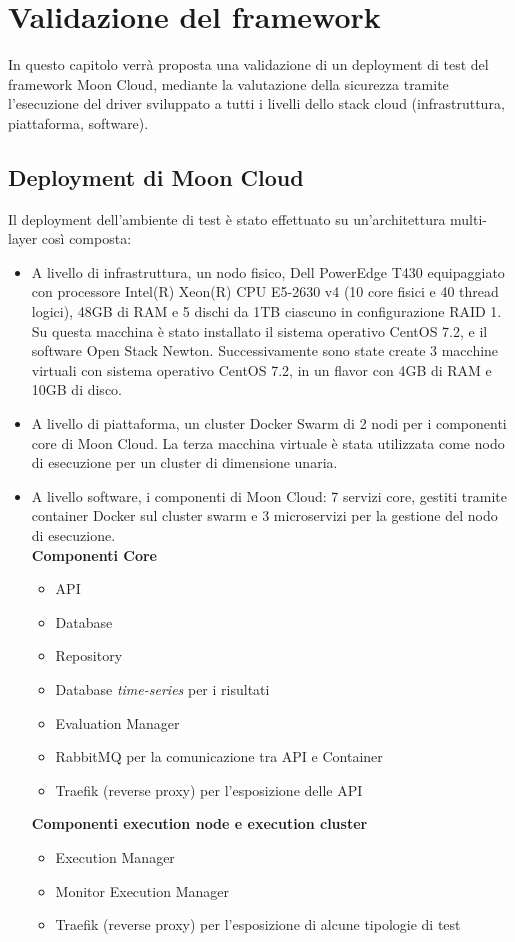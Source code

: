 \documentclass[../main.tex]{subfiles}
\begin{document}
\chapter{Validazione del framework}
In questo capitolo verrà proposta una validazione di un deployment di test del framework Moon Cloud, mediante la valutazione della sicurezza tramite l'esecuzione del driver sviluppato a tutti i livelli dello stack cloud (infrastruttura, piattaforma, software). 

\section{Deployment di Moon Cloud}

Il deployment dell'ambiente di test è stato effettuato su un'architettura multi-layer così composta:
\begin{itemize}
    \item A livello di infrastruttura, un nodo fisico, Dell PowerEdge T430 equipaggiato con processore Intel(R) Xeon(R) CPU E5-2630 v4 (10 core fisici e 40 thread logici), 48GB di RAM e 5 dischi da 1TB ciascuno in configurazione RAID 1. Su questa macchina è stato installato il sistema operativo CentOS 7.2, e il software Open Stack Newton.
        Successivamente sono state create 3 macchine virtuali con sistema operativo CentOS 7.2, in un flavor con 4GB di RAM e 10GB di disco.
    \item A livello di piattaforma, un cluster Docker Swarm di 2 nodi per i componenti core di Moon Cloud. La terza macchina virtuale è stata utilizzata come nodo di esecuzione per un cluster di dimensione unaria.
    \item A livello software, i componenti di Moon Cloud: 7 servizi core, gestiti tramite container Docker sul cluster swarm e 3 microservizi per la gestione del nodo di esecuzione.\\
        \textbf{Componenti Core}
        \begin{itemize}
            \item API
            \item Database
            \item Repository
            \item Database \textit{time-series} per i risultati
            \item Evaluation Manager
            \item RabbitMQ per la comunicazione tra API e Container
            \item Traefik (reverse proxy) per l'esposizione delle API
        \end{itemize}
        \textbf{Componenti execution node e execution cluster}
        \begin{itemize}
            \item Execution Manager
            \item Monitor Execution Manager
            \item Traefik (reverse proxy) per l'esposizione di alcune tipologie di test
        \end{itemize}
\end{itemize}
\end{document}
